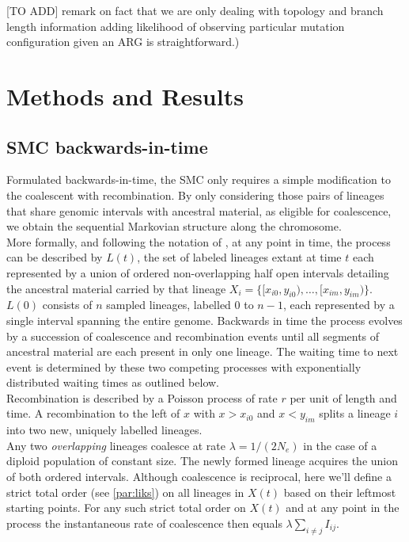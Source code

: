\documentclass{article}
\begin{document}
[TO ADD] remark on fact that we are only dealing with topology and branch length information
adding likelihood of observing particular mutation configuration given an ARG is straightforward.)


\section{Methods and Results}
\subsection{SMC backwards-in-time}\label{par:description}

Formulated backwards-in-time, the SMC \citep{mcvean_approximating_2005} only requires a 
simple modification to the 
coalescent with recombination. By only considering those pairs of 
lineages that share 
genomic intervals with ancestral material, as eligible for coalescence, we obtain the 
sequential Markovian structure along the chromosome.\\

More formally, and following the notation of \citet{mcvean_approximating_2005}, at any 
point in time, the process can be described by $L(t)$, the set of labeled lineages 
extant at time $t$ each represented by a union of ordered non-overlapping half open 
intervals detailing the ancestral material 
carried by that lineage $X_i = \{[x_{i0}, y_{i0}), \dotsc, [x_{im}, y_{im})\}$.
$L(0)$ consists of $n$ sampled lineages, labelled $0$ to $n-1$, each represented by a 
single interval spanning the entire genome.
Backwards in time the process evolves by a succession of coalescence and recombination 
events until all segments of ancestral material are each present in only one lineage. 
The waiting time to next event is determined by these two competing processes with exponentially 
distributed waiting times as outlined below.\\

Recombination is described by a Poisson process of rate $r$ per unit of length and time. 
A recombination to the 
left of $x$ with $x>x_{i0}$ and $x<y_{im}$ splits a lineage $i$ into two new, uniquely 
labelled lineages.\\

Any two \emph{overlapping} lineages coalesce at rate $\lambda = 1/(2N_e)$ in the case
of a diploid population of constant size. The newly formed lineage acquires the 
union of both ordered intervals.
Although coalescence is reciprocal, here we'll define a strict total order 
(see \ref{par:liks}) on 
all lineages in $X(t)$ based on their leftmost starting points. 
For any such strict total order on $X(t)$ and at any point in the process 
the instantaneous rate of coalescence then equals $\lambda \sum_{i \neq j} I_{ij}$.
\end{document}
